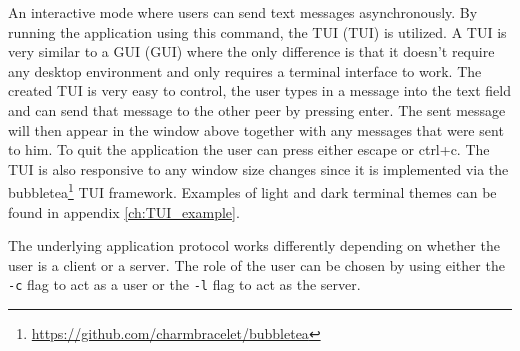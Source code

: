An interactive mode where users can send text messages asynchronously. By running the application using this command, the TUI (\acl{TUI}) is utilized. A TUI is very similar to a GUI (\acl{GUI}) where the only difference is that it doesn't require any desktop environment and only requires a terminal interface to work. The created TUI is very easy to control, the user types in a message into the text field and can send that message to the other peer by pressing enter. The sent message will then appear in the window above together with any messages that were sent to him. To quit the application the user can press either escape or ctrl+c. The TUI is also responsive to any window size changes since it is implemented via the bubbletea\footnote{\url{https://github.com/charmbracelet/bubbletea}} TUI framework. Examples of light and dark terminal themes can be found in appendix \ref{ch:TUI_example}.

The underlying application protocol works differently depending on whether the user is a client or a server. The role of the user can be chosen by using either the \texttt{-c} flag to act as a user or the \texttt{-l} flag to act as the server.
